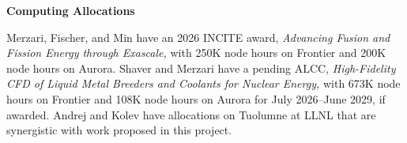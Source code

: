 \medskip
\noindent
{\bf Computing Allocations}
\medskip

Merzari, Fischer, and Min have an 2026 INCITE award,
{\em Advancing Fusion and Fission Energy through Exascale,}
with 250K node hours on Frontier and 200K node hours on Aurora.
   Shaver and Merzari have a pending ALCC, {\em High-Fidelity CFD of 
Liquid Metal Breeders and Coolants for Nuclear Energy,} with
673K node hours on Frontier and 108K node hours on Aurora for
July 2026--June 2029, if awarded.
  Andrej and Kolev have allocations on Tuolumne at LLNL 
that are synergistic with work proposed in this project.



